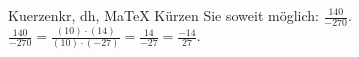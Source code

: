 \begin{MAufgabe}{Kuerzen}{kr, dh, MaTeX}
K\"urzen Sie soweit m\"oglich: $\frac{140}{-270}$.\\ 
\ifLsg\MLoesung
\quad $\frac{140}{-270}=\frac{(10)\cdot(14)}{(10)\cdot(-27)}=\frac{14}{-27}=\frac{-14}{27}$.\else\relax\fi
 \end{MAufgabe}